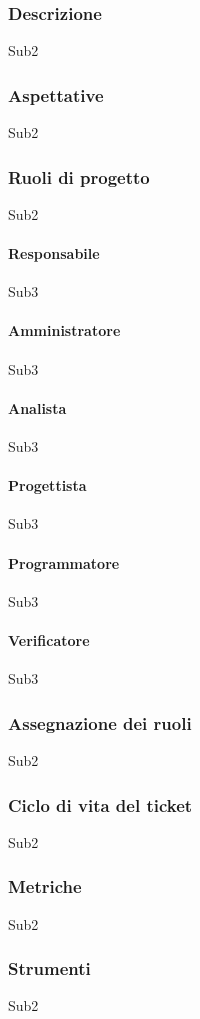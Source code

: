 \documentclass[../norme-di-progetto.tex]{subfiles}
\begin{document}
    \subsubsection{Descrizione}
    Sub2
    \subsubsection{Aspettative}
    Sub2
    \subsubsection{Ruoli di progetto}
    Sub2
        \paragraph{Responsabile}
        Sub3
        \paragraph{Amministratore}
        Sub3
        \paragraph{Analista}
        Sub3
        \paragraph{Progettista}
        Sub3
        \paragraph{Programmatore}
        Sub3
        \paragraph{Verificatore}
        Sub3
    \subsubsection{Assegnazione dei ruoli}
    Sub2
    \subsubsection{Ciclo di vita del ticket}
    Sub2
    \subsubsection{Metriche}
    Sub2
    \subsubsection{Strumenti}
    Sub2
\end{document}
